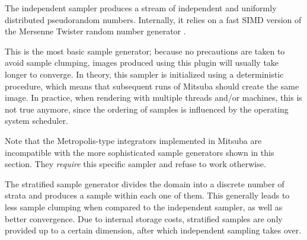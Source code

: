
The independent sampler produces a stream of independent and uniformly
distributed pseudorandom numbers. Internally, it relies on a fast SIMD version
of the Mersenne Twister random number generator \cite{Saito2008SIMD}.

This is the most basic sample generator; because no precautions are taken to avoid
sample clumping, images produced using this plugin will usually take longer to converge.
In theory, this sampler is initialized using a deterministic procedure, which means
that subsequent runs of Mitsuba should create the same image. In practice, when
rendering with multiple threads and/or machines, this is not true anymore, since the
ordering of samples is influenced by the operating system scheduler.

Note that the Metropolis-type integrators implemented in Mitsuba are incompatible with
the more sophisticated sample generators shown in this section. They \emph{require} this
specific sampler and refuse to work otherwise.

The stratified sample generator divides the domain into a discrete number
of strata and produces a sample within each one of them. This generally leads to less
sample clumping when compared to the independent sampler, as well as better
convergence. Due to internal storage costs, stratified samples are only provided up to a
certain dimension, after which independent sampling takes over.


